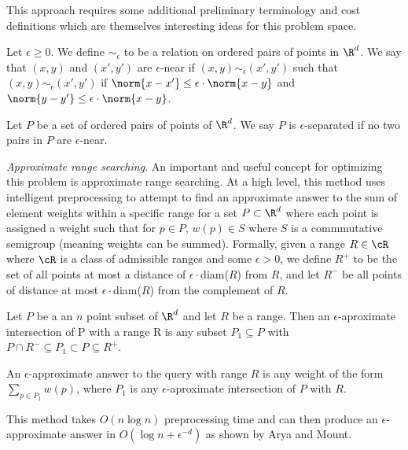 This approach requires some additional preliminary terminology and cost definitions which are themselves interesting ideas for this problem space.
\begin{definition}
  Let $\epsilon \geq 0$. We define $\sim_{\epsilon}$ to be a relation on ordered pairs of points in $\R^d$. We say that $(x,y)$ and $(x',y')$ are $\epsilon$-near if $(x,y) \sim_{\epsilon} (x', y')$ such that  $(x,y) \sim_{\epsilon} (x', y')$ if $\norm{x-x'} \leq \epsilon \cdot \norm{x-y}$ and $\norm{y - y'} \leq \epsilon \cdot \norm{x - y}$.
\end{definition}

\begin{definition}
Let $P$ be a set of ordered pairs of points of $\R^d$. We say $P$ is $\epsilon$-separated if no two pairs in $P$ are $\epsilon$-near.
\end{definition}

\noindent \emph{Approximate range searching}. An important and useful concept for optimizing this problem is approximate range searching. At a high level, this method uses intelligent preprocessing to attempt to find an approximate answer to the sum of element weights within a specific range for a set $P \subset \R^d$ where each point is assigned a weight such that for $p \in P$, $w(p) \in S$ where $S$ is a commmutative semigroup (meaning weights can be summed). Formally, given a range $R \in \cR$ where $\cR$ is a class of admissible ranges and some $\epsilon>0$, we define $R^+$ to be the set of all points at most a distance of $\epsilon \cdot$diam($R$) from $R$, and let $R^-$ be all points of distance at most $\epsilon \cdot$diam($R$) from the complement of $R$.

\begin{definition}
Let $P$ be a an $n$ point subset of $\R^d$ and let $R$ be a range. Then an $\epsilon$-aproximate intersection of P with a range R is any subset $P_1 \subseteq P$ with $P \cap R^- \subseteq P_1 \subset P \subseteq R^+$.
\end{definition}

\begin{definition}
An $\epsilon$-approximate answer to the query with range $R$ is any weight of the form $\sum_{p \in P_1} w(p)$, where $P_1$ is any $\epsilon$-aproximate intersection of $P$ with $R$.
\end{definition}

This method takes $O(n \log n)$ preprocessing time and can then produce an $\epsilon$-approximate answer in $O( \log n + \epsilon^{-d})$ as shown by Arya and Mount.

